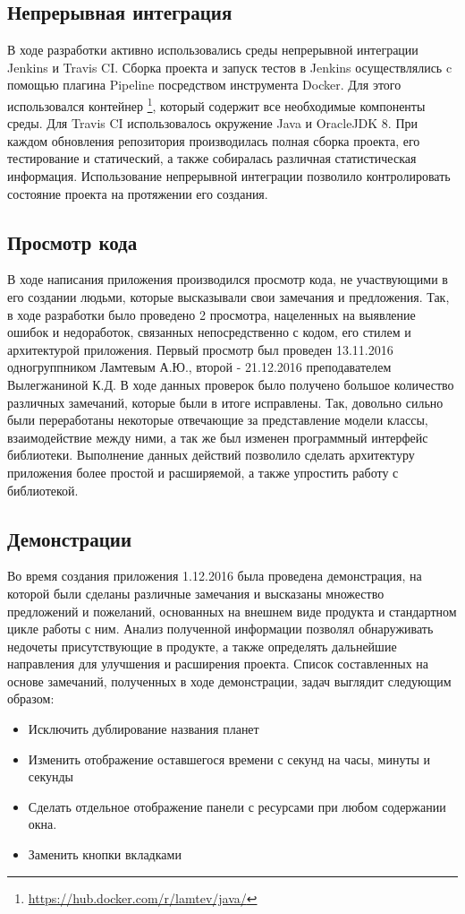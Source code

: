 \subsection{Непрерывная интеграция}

В ходе разработки активно использовались среды непрерывной интеграции Jenkins и Travis CI. Сборка проекта и запуск тестов в Jenkins осуществлялись c помощью плагина Pipeline посредством инструмента Docker. Для этого использовался контейнер \footnote{\url{https://hub.docker.com/r/lamtev/java/}}, который содержит все необходимые компоненты среды. Для Travis CI использовалось окружение Java и OracleJDK 8. При каждом обновления репозитория производилась полная сборка проекта, его тестирование и статический, а также собиралась различная статистическая информация. Использование непрерывной интеграции позволило контролировать состояние проекта на протяжении его создания.  
\subsection{Просмотр кода}

В ходе написания приложения производился просмотр кода, не участвующими в его создании людьми, которые высказывали свои замечания и предложения. Так, в ходе разработки было проведено 2 просмотра, нацеленных на выявление ошибок и недоработок, связанных  непосредственно с кодом, его стилем и архитектурой приложения. Первый просмотр был проведен 13.11.2016 одногруппником Ламтевым А.Ю., второй - 21.12.2016 преподавателем Вылегжаниной К.Д. В ходе данных проверок было получено большое количество различных замечаний, которые были в итоге исправлены. Так, довольно сильно были переработаны некоторые отвечающие за представление модели классы, взаимодействие между ними, а так же был изменен программный интерфейс библиотеки. Выполнение данных действий позволило сделать архитектуру приложения более простой и расширяемой, а также упростить работу с библиотекой.

\subsection{Демонстрации}

Во время создания приложения 1.12.2016 была проведена демонстрация, на которой были сделаны различные замечания и высказаны множество предложений и пожеланий, основанных на внешнем виде продукта и стандартном цикле работы с ним. Анализ полученной информации позволял обнаруживать недочеты присутствующие в продукте, а также определять дальнейшие направления для улучшения и расширения проекта. Список составленных на основе замечаний, полученных в ходе демонстрации, задач выглядит следующим образом:
\begin{itemize}
\item Исключить дублирование названия планет
\item Изменить отображение оставшегося времени с секунд на часы, минуты и секунды
\item Сделать отдельное отображение панели с ресурсами при любом содержании окна.
\item Заменить кнопки вкладками
\end{itemize}

